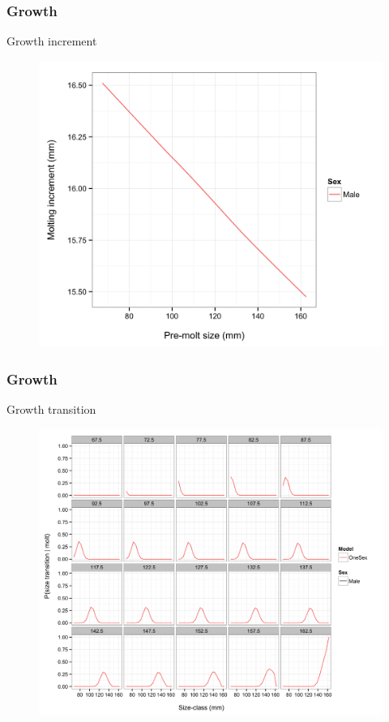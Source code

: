 \documentclass{beamer}
\begin{document}

\begin{frame}
\frametitle{Growth}
Growth increment
\begin{figure}[!htbp]
  \centering
  \includegraphics[width=0.75\linewidth]{../../examples/bbrkc/OneSex/figure/gi.png}
\end{figure}
\end{frame}


\begin{frame}
\frametitle{Growth}
Growth transition
\begin{figure}[!htbp]
  \centering
  \includegraphics[width=0.75\linewidth]{../../examples/bbrkc/OneSex/figure/growth_transition.png}
\end{figure}
\end{frame}
\end{document}
